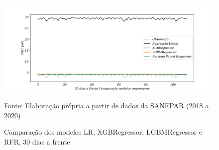 \begin{figure}[H]
	\centering
	\caption{Comparação dos modelos LR, XGBRegressor, LGBMRegressor e RFR, 30 dias a frente }
	\label{fig:60-LR-XGB-LGBM-RF24}
	\includegraphics[width=1\linewidth]{Apendices/Figuras/modelagem-24h/30-LR-XGB-LGBM-RF}
	
Fonte: Elaboração própria a partir de dados da SANEPAR (2018 a 2020)
\end{figure}